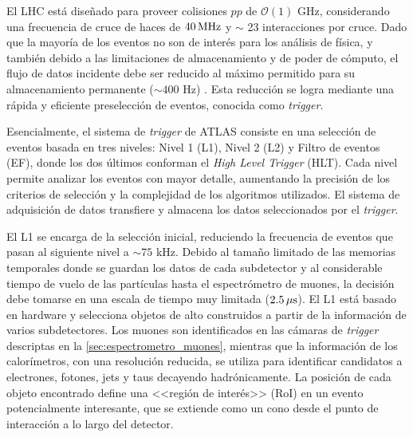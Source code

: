El LHC está diseñado para proveer colisiones $pp$ de $\mathcal{O}(1)$ GHz,
considerando una frecuencia de cruce de haces de $\unit[40]{MHz}$ y $\sim$ 23
interacciones por cruce. Dado que la mayoría de los eventos no son de interés
para los análisis de física, y también debido a las limitaciones de
almacenamiento y de poder de cómputo, el flujo de datos incidente debe ser
reducido al máximo permitido para su almacenamiento permanente ($\sim 400$ Hz)
\cite{Aad:2012xs}.
Esta reducción se logra mediante una rápida y eficiente preselección de eventos,
conocida como \emph{trigger}.

Esencialmente, el sistema de \emph{trigger} de ATLAS \cite{atlas} consiste en
una selección de eventos basada en tres niveles: Nivel 1 (L1), Nivel 2 (L2) y
Filtro de eventos (EF), donde los dos últimos conforman el \emph{High Level
  Trigger} (HLT). Cada nivel permite analizar los eventos con mayor detalle,
aumentando la precisión de los criterios de selección y la complejidad de los
algoritmos utilizados. El sistema de adquisición de datos transfiere y
almacena los datos seleccionados por el \emph{trigger}.

El L1 se encarga de la selección inicial, reduciendo la frecuencia de eventos
que pasan al siguiente nivel a $\sim 75$ kHz. Debido al tamaño limitado de las
memorias temporales donde se guardan los datos de cada subdetector y al
considerable tiempo de vuelo de las partículas hasta el espectrómetro de muones,
la decisión debe tomarse en una escala de tiempo muy limitada ($\unit[2.5]{\mu s}$).
El L1 está basado en hardware y selecciona objetos de alto {\pt}
construidos a partir de la información de varios subdetectores. Los muones son
identificados en las cámaras de \emph{trigger} descriptas en la
\cref{sec:espectrometro_muones}, mientras que la información de los
calorímetros, con una resolución reducida, se utiliza para identificar
candidatos a electrones, fotones, jets y taus decayendo hadrónicamente. La
posición de cada objeto encontrado define una <<región de interés>> (RoI) en
un evento potencialmente interesante, que se extiende como un cono desde el
punto de interacción a lo largo del detector.

